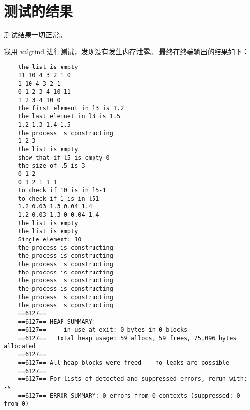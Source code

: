 \documentclass[UTF8]{ctexart}
\begin{document}
\section{测试的结果}

测试结果一切正常。

我用 valgrind 进行测试，发现没有发生内存泄露。
最终在终端输出的结果如下：
\begin{lstlisting}
	the list is empty
	11 10 4 3 2 1 0 
	1 10 4 3 2 1 
	0 1 2 3 4 10 11 
	1 2 3 4 10 0 
	the first element in l3 is 1.2
	the last elemnet in l3 is 1.5
	1.2 1.3 1.4 1.5 
	the process is constructing
	1 2 3 
	the list is empty
	show that if l5 is empty 0
	the size of l5 is 3
	0 1 2 
	0 1 2 1 1 1 
	to check if 10 is in l5-1
	to check if 1 is in l51
	1.2 0.03 1.3 0.04 1.4 
	1.2 0.03 1.3 0 0.04 1.4 
	the list is empty
	the list is empty
	Single element: 10
	the process is constructing
	the process is constructing
	the process is constructing
	the process is constructing
	the process is constructing
	the process is constructing
	the process is constructing
	the process is constructing
	==6127== 
	==6127== HEAP SUMMARY:
	==6127==     in use at exit: 0 bytes in 0 blocks
	==6127==   total heap usage: 59 allocs, 59 frees, 75,096 bytes allocated
	==6127== 
	==6127== All heap blocks were freed -- no leaks are possible
	==6127== 
	==6127== For lists of detected and suppressed errors, rerun with: -s
	==6127== ERROR SUMMARY: 0 errors from 0 contexts (suppressed: 0 from 0)
\end{lstlisting}
\end{document}
